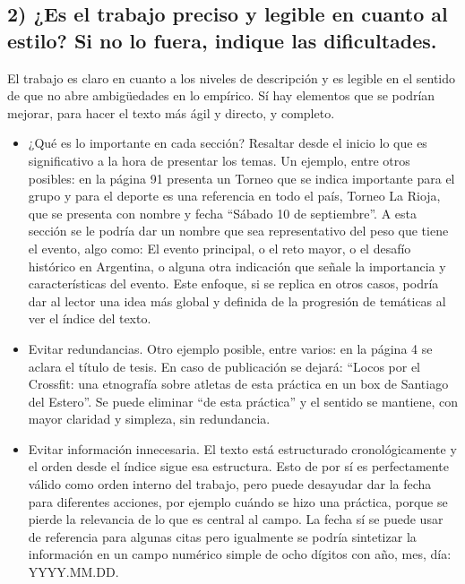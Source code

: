 \subsection*{2) ¿Es el trabajo preciso y legible en cuanto al estilo? Si no lo fuera, indique las dificultades.}
\label{es-el-trabajo-preciso-y-legible-en-cuanto-al-estilo-si-no-lo-fuera-indique-las-dificultades.}

El trabajo es claro en cuanto a los niveles de descripción y es legible
en el sentido de que no abre ambigüedades en lo empírico. Sí hay elementos que se
podrían mejorar, para hacer el texto más ágil y directo, y completo.

\begin{itemize}
\tightlist
\item
  ¿Qué es lo importante en cada sección? Resaltar desde el inicio lo que
  es significativo a la hora de presentar los temas. Un ejemplo, entre otros posibles: en la
  página 91 presenta un Torneo que se indica importante para el grupo
  y para el deporte es una referencia en todo el país, Torneo La Rioja,
  que se presenta con nombre y fecha ``Sábado 10 de septiembre''. A esta
  sección se le podría dar un nombre que sea representativo del peso que
  tiene el evento, algo como: El evento principal, o el reto mayor, o el
  desafío histórico en Argentina, o alguna otra indicación que señale
  la importancia y características del evento.
  Este enfoque, si se replica en otros casos, podría dar al lector una idea más global y definida
  de la progresión de temáticas al ver el índice del texto.
\item
  Evitar redundancias. Otro ejemplo posible, entre varios: en la página 4 se aclara el título de
  tesis. En caso de publicación se dejará: ``Locos por el Crossfit: una
  etnografía sobre atletas de esta práctica en un box de Santiago del
  Estero''. Se puede eliminar ``de esta práctica'' y el sentido se
  mantiene, con mayor claridad y simpleza, sin redundancia.
\item
  Evitar información innecesaria. El texto está estructurado
  cronológicamente y el orden desde el índice sigue esa estructura. Esto
  de por sí es perfectamente válido como orden interno del trabajo, pero
  puede desayudar dar la fecha
  para diferentes acciones, por ejemplo cuándo se hizo una práctica, 
  porque se pierde la relevancia de lo que es central
  al campo. La fecha sí se puede usar de referencia para algunas citas
  pero igualmente se podría sintetizar la información en un campo
  numérico simple de ocho dígitos con año, mes, día: YYYY.MM.DD.

\end{itemize}
